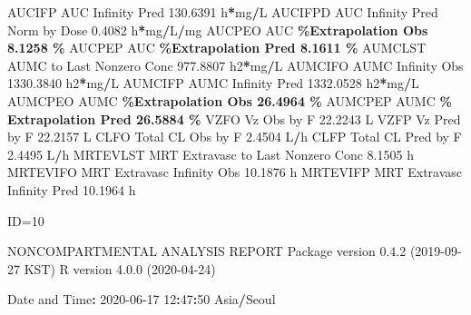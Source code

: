 \documentclass[
  12pt,
]{krantz}
\newenvironment{Shaded}{\begin{snugshade}}{\end{snugshade}}
\newcommand{\DecValTok}[1]{\textcolor[rgb]{0.00,0.00,0.81}{#1}}
\newcommand{\FloatTok}[1]{\textcolor[rgb]{0.00,0.00,0.81}{#1}}
\newcommand{\NormalTok}[1]{#1}
\newcommand{\OperatorTok}[1]{\textcolor[rgb]{0.81,0.36,0.00}{\textbf{#1}}}
\newcommand{\StringTok}[1]{\textcolor[rgb]{0.31,0.60,0.02}{#1}}
\begin{document}
\begin{Shaded}
\begin{Highlighting}[]
\NormalTok{AUCIFP     AUC Infinity Pred                             }\FloatTok{130.6391}\NormalTok{ h}\OperatorTok{*}\NormalTok{mg}\OperatorTok{/}\NormalTok{L}
\NormalTok{AUCIFPD    AUC Infinity Pred Norm by Dose                  }\FloatTok{0.4082}\NormalTok{ h}\OperatorTok{*}\NormalTok{mg}\OperatorTok{/}\NormalTok{L}\OperatorTok{/}\NormalTok{mg}
\NormalTok{AUCPEO     AUC }\OperatorTok{\%Extrapolation Obs                          8.1258 \%}
\NormalTok{AUCPEP     AUC }\OperatorTok{\%Extrapolation Pred                         8.1611 \%}
\NormalTok{AUMCLST    AUMC to Last Nonzero Conc                     }\FloatTok{977.8807}\NormalTok{ h2}\OperatorTok{*}\NormalTok{mg}\OperatorTok{/}\NormalTok{L}
\NormalTok{AUMCIFO    AUMC Infinity Obs                            }\FloatTok{1330.3840}\NormalTok{ h2}\OperatorTok{*}\NormalTok{mg}\OperatorTok{/}\NormalTok{L}
\NormalTok{AUMCIFP    AUMC Infinity Pred                           }\FloatTok{1332.0528}\NormalTok{ h2}\OperatorTok{*}\NormalTok{mg}\OperatorTok{/}\NormalTok{L}
\NormalTok{AUMCPEO    AUMC }\OperatorTok{\%Extrapolation Obs                        26.4964 \%}
\NormalTok{AUMCPEP    AUMC }\OperatorTok{\% Extrapolation Pred                      26.5884 \%}
\NormalTok{VZFO       Vz Obs by F                                    }\FloatTok{22.2243}\NormalTok{ L}
\NormalTok{VZFP       Vz Pred by F                                   }\FloatTok{22.2157}\NormalTok{ L}
\NormalTok{CLFO       Total CL Obs by F                               }\FloatTok{2.4504}\NormalTok{ L}\OperatorTok{/}\NormalTok{h}
\NormalTok{CLFP       Total CL Pred by F                              }\FloatTok{2.4495}\NormalTok{ L}\OperatorTok{/}\NormalTok{h}
\NormalTok{MRTEVLST   MRT Extravasc to Last Nonzero Conc              }\FloatTok{8.1505}\NormalTok{ h}
\NormalTok{MRTEVIFO   MRT Extravasc Infinity Obs                     }\FloatTok{10.1876}\NormalTok{ h}
\NormalTok{MRTEVIFP   MRT Extravasc Infinity Pred                    }\FloatTok{10.1964}\NormalTok{ h}





\NormalTok{ID=}\DecValTok{10}

\NormalTok{                        NONCOMPARTMENTAL ANALYSIS REPORT}
\NormalTok{                       Package version }\DecValTok{0}\NormalTok{.}\FloatTok{4.2}\NormalTok{ (}\DecValTok{2019{-}09{-}27}\NormalTok{ KST)}
\NormalTok{                          R version }\DecValTok{4}\NormalTok{.}\FloatTok{0.0}\NormalTok{ (}\DecValTok{2020{-}04{-}24}\NormalTok{)}

\NormalTok{Date and Time}\OperatorTok{:}\StringTok{ }\DecValTok{2020{-}06{-}17} \DecValTok{12}\OperatorTok{:}\DecValTok{47}\OperatorTok{:}\DecValTok{50}\NormalTok{ Asia}\OperatorTok{/}\NormalTok{Seoul}


\end{Highlighting}
\end{Shaded}
\end{document}
